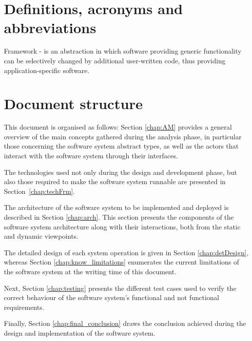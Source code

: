 \section{Definitions, acronyms and abbreviations}
Framework - is an abstraction in which software providing generic functionality
can be selectively changed by additional user-written code, thus providing application-specific software.


  
\section{Document structure} 
This document is organised as follows: Section \ref{chap:AM} provides a general
overview of the main concepts gathered during the analysis phase, in particular those concerning the software system abstract
types, as well as the actors that interact with the
software system through their interfaces. 

The technologies used not only during the design and development phase, but 
also those required to make the software system runnable are presented in
Section~\ref{chap:techFrm}.

The architecture of the software system to be implemented and deployed is
described in Section \ref{chap:arch}. This section presents the components of
the software system architecture along with their interactions, both from the static and dynamic viewpoints.

The detailed design of each \gls{system operation} is given in Section
\ref{chap:detDesign}, whereas Section \ref{chap:know_limitations} enumerates the
current limitations of the software system at the writing time of this document.

Next, Section \ref{chap:testing} presents the different test cases used to
verify the correct behaviour of the software system's functional and not functional requirements.

Finally, Section \ref{chap:final_conclusion} draws the
conclusion achieved during the design and implementation of the software system.
 
 